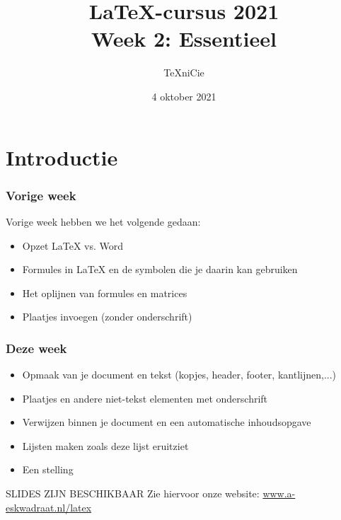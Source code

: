 \documentclass{beamer}
\title{\LaTeX-cursus 2021\\
Week 2: Essentieel}
\author{\TeX niCie}
\date{4 oktober 2021}
\begin{document}
\begin{frame}
\titlepage
\end{frame}



\section*{Introductie}


\begin{frame}
\frametitle{Vorige week}
Vorige week hebben we het volgende gedaan:
\begin{itemize}
\item Opzet \LaTeX{} vs. Word
\item Formules in \LaTeX{} en de symbolen die je daarin kan gebruiken
\item Het oplijnen van formules en matrices
\item Plaatjes invoegen (zonder onderschrift)
\end{itemize}
\end{frame}


\begin{frame}
\frametitle{Deze week}
\begin{itemize}
	\item Opmaak van je document en tekst (kopjes, header, footer, kantlijnen,...)
	\item Plaatjes en andere niet-tekst elementen met onderschrift
	\item Verwijzen binnen je document en een automatische inhoudsopgave
	\item Lijsten maken zoals deze lijst eruitziet
	\item Een stelling
\end{itemize}
\end{frame}

\begin{frame}{SLIDES ZIJN BESCHIKBAAR}
	\huge{Zie hiervoor onze website: \url{www.a-eskwadraat.nl/latex}}
\end{frame}
\end{document}
